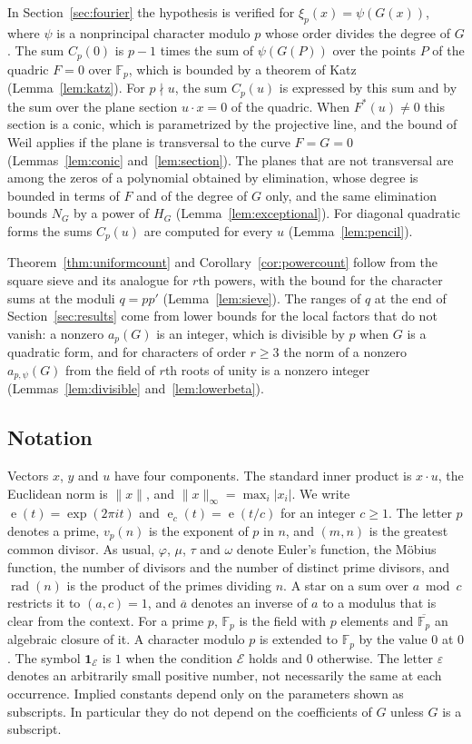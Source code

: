 \documentclass[11pt]{amsart}
\numberwithin{equation}{section}
\numberwithin{figure}{section}
\theoremstyle{definition}
\newcommand{\e}{\operatorname{e}}
\newcommand{\eps}{\varepsilon}
\newcommand{\abs}[1]{\lvert #1\rvert}
\newcommand{\Fp}{\mathbb F_p}
\newcommand{\rad}{\operatorname{rad}}
\begin{document}
In Section~\ref{sec:fourier} the hypothesis is verified for
$\xi_p(x)=\psi(G(x))$, where $\psi$ is a nonprincipal character
modulo $p$ whose order divides the degree of $G$. The sum $C_p(0)$ is $p-1$ times the
sum of $\psi(G(P))$ over the points $P$ of the quadric $F=0$ over
$\Fp$, which is bounded by a theorem of Katz \cite{K}
(Lemma~\ref{lem:katz}). For $p\nmid u$, the sum $C_p(u)$ is
expressed by this sum and by the sum over the plane section
$u\cdot x=0$ of the quadric. When $F^*(u)\ne0$ this section is a conic, which is
parametrized by the projective line, and the bound of Weil applies
if the plane is transversal to the curve $F=G=0$
(Lemmas~\ref{lem:conic} and~\ref{lem:section}). The planes that are
not transversal are among the zeros of a polynomial obtained by
elimination, whose degree is bounded in terms of $F$ and of the
degree of $G$ only, and the same elimination bounds $N_G$ by a power of
$H_G$ (Lemma~\ref{lem:exceptional}). For
diagonal quadratic forms the sums $C_p(u)$ are computed for every
$u$ (Lemma~\ref{lem:pencil}).

Theorem~\ref{thm:uniformcount} and Corollary~\ref{cor:powercount}
follow from the square sieve and its analogue for $r$th powers, with
the bound for the character sums at the moduli $q=pp'$
(Lemma~\ref{lem:sieve}). The ranges of $q$ at the end of
Section~\ref{sec:results} come from lower bounds for the local
factors that do not vanish: a nonzero $a_p(G)$ is an integer, which
is divisible by $p$ when $G$ is a quadratic form, and for characters
of order $r\ge3$ the norm of a nonzero $a_{p,\psi}(G)$ from the field
of $r$th roots of unity is a nonzero integer
(Lemmas~\ref{lem:divisible} and~\ref{lem:lowerbeta}).

\subsection{Notation}\label{sec:notation}

Vectors $x$, $y$ and $u$ have four components. The standard inner
product is $x\cdot u$, the Euclidean norm is $\lVert x\rVert$, and
$\lVert x\rVert_\infty=\max_i\abs{x_i}$. We write
$\e(t)=\exp(2\pi it)$ and $\e_c(t)=\e(t/c)$ for an integer $c\ge1$.
The letter $p$ denotes a prime, $v_p(n)$ is the exponent of $p$ in
$n$, and $(m,n)$ is the greatest common divisor. As usual, $\varphi$,
$\mu$, $\tau$ and $\omega$ denote Euler's function, the M\"obius
function, the number of divisors and the number of distinct prime
divisors, and $\rad(n)$ is the product of the primes dividing $n$. A
star on a sum over $a\bmod c$ restricts it to $(a,c)=1$, and
$\overline a$ denotes an inverse of $a$ to a modulus that is clear
from the context. For a prime $p$, $\Fp$ is the field with $p$
elements and $\overline{\Fp}$ an algebraic closure of it. A character
modulo $p$ is extended to $\Fp$ by the value $0$ at $0$. The symbol
$\mathbf 1_{\mathcal E}$ is $1$ when the condition $\mathcal E$ holds
and $0$ otherwise. The letter $\eps$ denotes an arbitrarily small
positive number, not necessarily the same at each occurrence. Implied
constants depend only on the parameters shown as subscripts. In
particular they do not depend on the coefficients of $G$ unless $G$
is a subscript.
\end{document}
